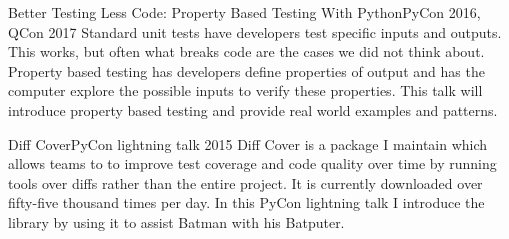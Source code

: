 
\begin{talks}
	\talk
	{Better Testing Less Code: Property Based Testing With Python}{PyCon 2016, QCon 2017}
	{Standard unit tests have developers test specific inputs and outputs. This works, but often what breaks code are the cases we did not think about. Property based testing has developers define properties of output and has the computer explore the possible inputs to verify these properties. This talk will introduce property based testing and provide real world examples and patterns.}

	\talk
	{Diff Cover}{PyCon lightning talk 2015}
	{Diff Cover is a package I maintain which allows teams to to improve test coverage and code quality over time by running tools over diffs rather than the entire project. It is currently downloaded over fifty-five thousand times per day. In this PyCon lightning talk I introduce the library by using it to assist Batman with his Batputer.}

\end{talks}